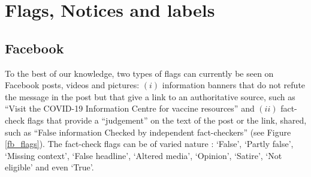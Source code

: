 \documentclass{article}
\begin{document}

\section{Flags, Notices and labels} \label{flags}

\subsection{Facebook}

To the best of our knowledge, two types of flags can currently be seen on Facebook posts, videos and pictures: $(i)$ information banners that do not refute the message in the post but that give a link to an authoritative source, such as ``Visit the COVID-19 Information Centre for vaccine resources'' and $(ii)$ fact-check flags that provide a ``judgement'' on the text of the post or the link, shared, such as ``False information Checked by independent fact-checkers'' (see Figure \ref{fb_flags}). The fact-check flags can be of varied nature : `False', `Partly false', `Missing context', `False headline', `Altered media', `Opinion', `Satire', `Not eligible' and even `True'.
\end{document}
